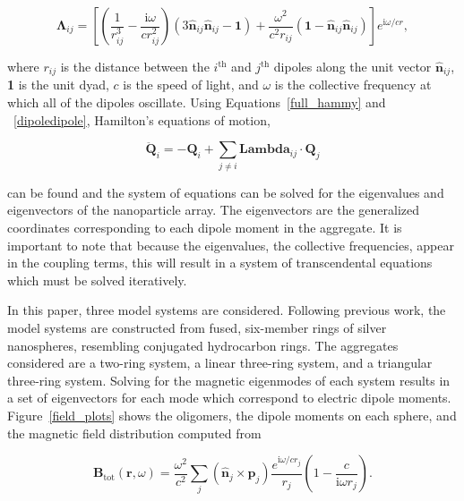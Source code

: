 \documentclass[journal=apchd5,manuscript=article]{achemso}
\begin{document}
\begin{equation}
\boldsymbol{\Lambda}_{ij} = \left[\left(\frac{1}{r_{ij}^3} - \frac{\textrm{i}\omega}{cr_{ij}^2}\right)\left(3\hat{\textbf{n}}_{ij}\hat{\textbf{n}}_{ij} - \textbf{1}\right) + \frac{\omega^2}{c^2r_{ij}}\left(\textbf{1} - \hat{\textbf{n}}_{ij}\hat{\textbf{n}}_{ij}\right)\right]e^{\textrm{i}\omega/c r},
\label{dipoledipole}
\end{equation}

where $r_{ij}$ is the distance between the $i^{\textrm{th}}$ and $j^{\textrm{th}}$ dipoles along the unit vector $\hat{\textbf{n}}_{ij}$, \textbf{1} is the unit dyad, $c$ is the speed of light, and $\omega$ is the collective frequency at which all of the dipoles oscillate. Using Equations~\ref{full_hammy} and ~\ref{dipoledipole}, Hamilton's equations of motion,

\begin{equation}
\ddot{\textbf{Q}}_{i} = -\textbf{Q}_{i} + \sum_{j\neq i}\boldsymbol{Lambda}_{ij}\cdot\textbf{Q}_{j}
\label{eom}
\end{equation}

 can be found and the system of equations can be solved for the eigenvalues and eigenvectors of the nanoparticle array. The eigenvectors are the generalized coordinates corresponding to each dipole moment in the aggregate. It is important to note that because the eigenvalues, the collective frequencies, appear in the coupling terms, this will result in a system of transcendental equations which must be solved iteratively. 

In this paper, three model systems are considered. Following previous work, the model systems are constructed from fused, six-member rings of silver nanospheres, resembling conjugated hydrocarbon rings. The aggregates considered are a two-ring system, a linear three-ring system, and a triangular three-ring system. Solving for the magnetic eigenmodes of each system results in a set of eigenvectors for each mode which correspond to electric dipole moments. Figure~\ref{field_plots} shows the oligomers, the dipole moments on each sphere, and the magnetic field distribution computed from\cite{jackson_classical_1999}

\begin{equation}
\textbf{B}_{\textrm{tot}}(\textbf{r},\omega) = \frac{\omega^2}{c^2}\sum_{j}(\hat{\textbf{n}}_{j}\times\textbf{p}_{j})\frac{e^{\textrm{i}\omega/c r_j}}{r_j}\left(1 - \frac{c}{\textrm{i}\omega r_{j}}\right).
\label{magnetic_field}
\end{equation}
\end{document}
